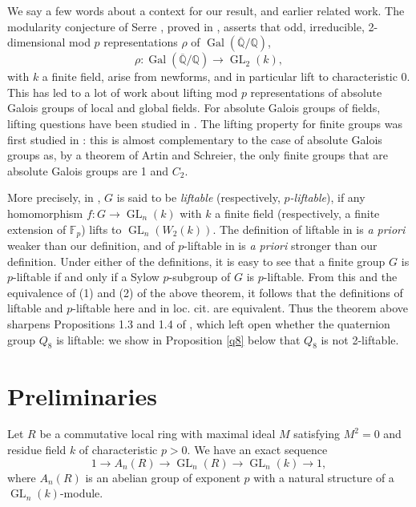 \documentclass[12pt]{amsart}
\numberwithin{equation}{section}
\theoremstyle{definition}
\renewcommand{\(}{\bigl(}
\renewcommand{\)}{\bigr)}
\newcommand{\Gal}{\operatorname{Gal}}
\newcommand{\GL}{\operatorname{GL}}
\newcommand{\F}{\mathbb{F}}
\newcommand{\Q}{\mathbb{Q}}
\begin{document}
We say a few words about  a context for  our result, and earlier related work. The modularity  conjecture of Serre \cite{Serre}, proved in \cite{KW},  asserts  that odd, irreducible, 2-dimensional  mod $p$  representations $\rho$  of  $\Gal(\overline{\Q}/\Q)$,  \[\rho:\Gal(\overline{\Q}/\Q) \to \GL_2(k),\] with $k$ a finite field,  arise from newforms, and in particular lift to characteristic 0. This has led to a lot of work about lifting  mod $p$ representations of absolute Galois groups of local and global fields.  For absolute Galois groups of  fields,  lifting questions have been studied in \cite{MS26}.  The lifting property for   finite groups was first studied in \cite{KL}: this  is almost complementary to the case  of absolute Galois groups as,   by  a   theorem of Artin and Schreier, the only finite groups that are absolute Galois groups are 1 and $C_2$.



More precisely, in  \cite{KL},  $G$ is  said to be \emph{liftable} (respectively, \emph{$p$-liftable}), if any homomorphism $f:G \rightarrow \GL_n(k)$   with $k$ a finite field (respectively, a finite extension of $\F_p$) lifts to $\GL_n(W_2(k))$.   The definition of liftable in \cite{KL}  is {\it a priori}  weaker than our definition, and of $p$-liftable in \cite{KL}  is {\it a priori}  stronger than our definition. Under  either  of   the definitions,  it is easy to see that a  finite group $G$  is $p$-liftable if and only if a  Sylow $p$-subgroup of $G$  is  $p$-liftable. From this and the equivalence of (1) and (2) of the above theorem, it follows  that the definitions of liftable and $p$-liftable here and in loc. cit. are equivalent. Thus the theorem above sharpens Propositions 1.3 and 1.4 of \cite{KL},  which left open  whether the quaternion group  $Q_8$ is liftable: we show in  Proposition  \ref{q8}  below that $Q_8$ is not 2-liftable.


\section{Preliminaries}

Let $R$ be a commutative local ring with maximal ideal $M$ satisfying $M^2=0$ and residue field $k$ of characteristic $p>0$.
We have an exact sequence
\begin{equation}\label{modp2}
1\to A_n(R)\to \GL_n(R) \to \GL_n(k)\to 1,
\end{equation}
where $A_n(R)$ is an abelian group of exponent $p$ with a natural structure of a $\GL_n(k)$-module.
\end{document}
